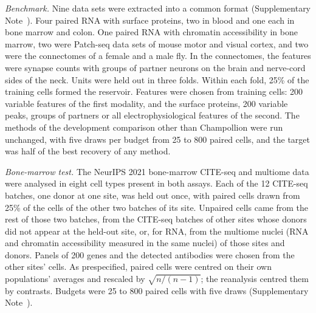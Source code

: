 \documentclass[pdflatex,sn-vancouver-num,iicol]{sn-jnl}
\begin{document}
\textit{Benchmark.} Nine data sets were extracted into a common format (Supplementary Note~). Four paired RNA with surface proteins, two in blood\cite{hao2021,stephenson2021} and one each in bone marrow\cite{luecken2021sandbox} and colon\cite{mennillo2024}. One paired RNA with chromatin accessibility in bone marrow\cite{luecken2021sandbox}, two were Patch-seq\cite{cadwell2016} data sets of mouse motor\cite{scala2021} and visual cortex\cite{gouwens2020,gala2021}, and two were the connectomes of a female\cite{bates2026} and a male\cite{berg2025} fly. In the connectomes, the features were synapse counts with groups of partner neurons on the brain and nerve-cord sides of the neck. Units were held out in three folds. Within each fold, 25\% of the training cells formed the reservoir. Features were chosen from training cells: 200 variable features of the first modality, and the surface proteins, 200 variable peaks, groups of partners or all electrophysiological features of the second. The methods of the development comparison other than Champollion were run unchanged, with five draws per budget from 25 to 800 paired cells, and the target was half of the best recovery of any method.

\textit{Bone-marrow test.} The NeurIPS 2021 bone-marrow CITE-seq and multiome data\cite{luecken2021sandbox} were analysed in eight cell types present in both assays. Each of the 12 CITE-seq batches, one donor at one site, was held out once, with paired cells drawn from 25\% of the cells of the other two batches of its site. Unpaired cells came from the rest of those two batches, from the CITE-seq batches of other sites whose donors did not appear at the held-out site, or, for RNA, from the multiome nuclei (RNA and chromatin accessibility measured in the same nuclei) of those sites and donors. Panels of 200 genes and the detected antibodies were chosen from the other sites' cells. As prespecified, paired cells were centred on their own populations' averages and rescaled by $\sqrt{n/(n-1)}$; the reanalysis centred them by contrasts. Budgets were 25 to 800 paired cells with five draws (Supplementary Note~).
\end{document}

